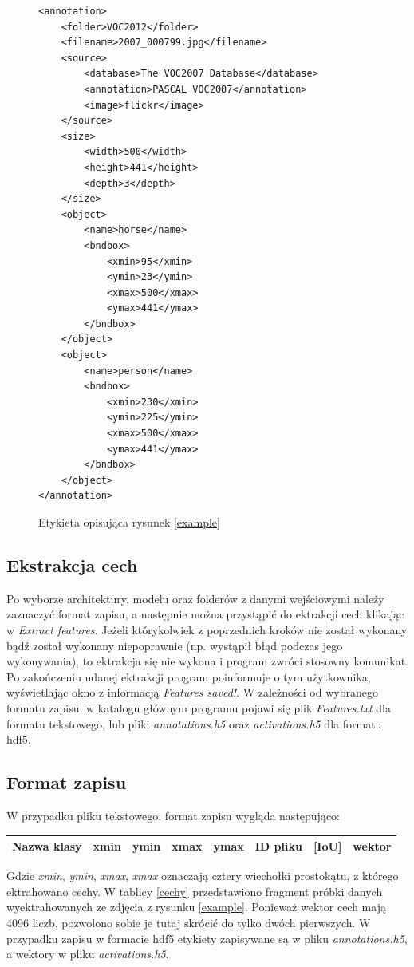 \documentclass[a4paper,twoside,12pt]{book}
\begin{document}
{\begin{figure}
\centering
\begin{lstlisting}
<annotation>
	<folder>VOC2012</folder>
	<filename>2007_000799.jpg</filename>
	<source>
		<database>The VOC2007 Database</database>
		<annotation>PASCAL VOC2007</annotation>
		<image>flickr</image>
	</source>
	<size>
		<width>500</width>
		<height>441</height>
		<depth>3</depth>
	</size>
	<object>
		<name>horse</name>
		<bndbox>
			<xmin>95</xmin>
			<ymin>23</ymin>
			<xmax>500</xmax>
			<ymax>441</ymax>
		</bndbox>
	</object>
	<object>
		<name>person</name>
		<bndbox>
			<xmin>230</xmin>
			<ymin>225</ymin>
			<xmax>500</xmax>
			<ymax>441</ymax>
		</bndbox>
	</object>
</annotation>

\end{lstlisting}
\caption{Etykieta opisująca rysunek \ref{example}}
\label{etykieta}
\end{figure}
\subsection{Ekstrakcja cech}
{Po wyborze architektury, modelu oraz folderów z danymi wejściowymi należy zaznaczyć format zapisu, a następnie można przystąpić do ektrakcji cech klikając w \emph{Extract features}. Jeżeli którykolwiek z poprzednich kroków nie został wykonany bądź został wykonany niepoprawnie (np. wystąpił błąd podczas jego wykonywania), to ektrakcja się nie wykona i program zwróci stosowny komunikat. Po zakończeniu udanej ektrakcji program poinformuje o tym użytkownika, wyświetlając okno z informacją \emph{Features saved!}. W zależności od wybranego formatu zapisu, w katalogu głównym programu pojawi się plik \emph{Features.txt} dla formatu tekstowego, lub pliki \emph{annotations.h5} oraz  \emph{activations.h5} dla formatu hdf5. }
\subsection{Format zapisu}
{W przypadku pliku tekstowego, format zapisu wygląda następująco:}

\begin{table}[h!]
\centering
\begin{tabular}{|l|l|l|l|l|l|l|l|}
\hline
Nazwa klasy & xmin & ymin & xmax & ymax & ID pliku & [IoU]& wektor \\
\hline

\end{tabular}
\end{table}  
{Gdzie \emph{xmin}, \emph{ymin}, \emph{xmax}, \emph{xmax} oznaczają cztery wiechołki prostokątu, z którego ektrahowano cechy. W tablicy \ref{cechy} przedstawiono fragment próbki danych wyektrahowanych ze zdjęcia z rysunku \ref{example}. Ponieważ wektor cech mają 4096 liczb, pozwolono sobie je tutaj skrócić do tylko dwóch pierwszych.}
{W przypadku zapisu w formacie hdf5 etykiety zapisywane są w pliku \emph{annotations.h5}, a wektory w pliku \emph{activations.h5}.}
\label{format}



}
\end{document}
